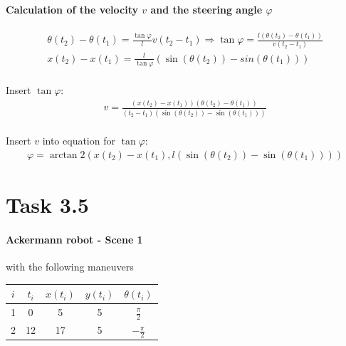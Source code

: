 \documentclass{article}
\begin{document}
	\paragraph{Calculation of the velocity $v$ and the steering angle $\varphi$}
	\begin{gather}
	\theta(t_2) - \theta(t_1) = \frac{\tan \varphi}{l} v (t_2 - t_1) \Rightarrow \tan \varphi = \frac{l (\theta(t_2) - \theta(t_1))}{v (t_2 - t_1)}\\
	x(t_2) - x(t_1) = \frac{l}{\tan \varphi} (\sin(\theta(t_2)) - sin(\theta(t_1)))
	\end{gather}\\
	Insert $\tan \varphi$:
	\begin{gather}
	v = \frac{(x(t_2) - x(t_1))(\theta(t_2) - \theta(t_1))}{(t_2 - t_1)(\sin(\theta(t_2)) - \sin(\theta(t_1)))}
	\end{gather}\\
	Insert $v$ into equation for $\tan \varphi$:
	\begin{gather}
	\varphi = \arctan2(x(t_2) - x(t_1), l (\sin(\theta(t_2)) - \sin(\theta(t_1))))
	\end{gather}
	
	\section{Task 3.5}
	\paragraph{Ackermann robot - Scene 1} with the following maneuvers
	
	\begin{tabular}{|c|c|c|c|c|}
		\hline 
		$i$ & $t_i$ & $x(t_i)$ & $y(t_i)$ & $\theta(t_i)$ \\ 
		\hline 
		1 & 0 & 5 & 5 & $\frac{\pi}{2}$ \\ 
		\hline 
		2 & 12 & 17 & 5 & $-\frac{\pi}{2}$ \\ 
		\hline 
	\end{tabular} 
	\\
		
\end{document}

